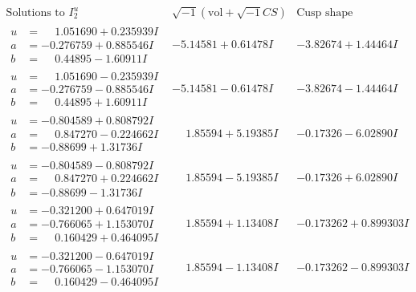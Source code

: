 \documentclass[1p]{elsarticle_modified}
\theoremstyle{definition}
\newcommand{\I}{\sqrt{-1}}
\begin{document}
$$\begin{array}{c|c|c}  
\text{Solutions to }I^u_{2}& \I (\text{vol} + \sqrt{-1}CS) & \text{Cusp shape}\\
 \hline 
\begin{aligned}
u &= \phantom{-}1.051690 + 0.235939 I \\
a &= -0.276759 + 0.885546 I \\
b &= \phantom{-}0.44895 - 1.60911 I\end{aligned}
 & -5.14581 + 0.61478 I & -3.82674 + 1.44464 I \\ \hline\begin{aligned}
u &= \phantom{-}1.051690 - 0.235939 I \\
a &= -0.276759 - 0.885546 I \\
b &= \phantom{-}0.44895 + 1.60911 I\end{aligned}
 & -5.14581 - 0.61478 I & -3.82674 - 1.44464 I \\ \hline\begin{aligned}
u &= -0.804589 + 0.808792 I \\
a &= \phantom{-}0.847270 - 0.224662 I \\
b &= -0.88699 + 1.31736 I\end{aligned}
 & \phantom{-}1.85594 + 5.19385 I & -0.17326 - 6.02890 I \\ \hline\begin{aligned}
u &= -0.804589 - 0.808792 I \\
a &= \phantom{-}0.847270 + 0.224662 I \\
b &= -0.88699 - 1.31736 I\end{aligned}
 & \phantom{-}1.85594 - 5.19385 I & -0.17326 + 6.02890 I \\ \hline\begin{aligned}
u &= -0.321200 + 0.647019 I \\
a &= -0.766065 + 1.153070 I \\
b &= \phantom{-}0.160429 + 0.464095 I\end{aligned}
 & \phantom{-}1.85594 + 1.13408 I & -0.173262 + 0.899303 I \\ \hline\begin{aligned}
u &= -0.321200 - 0.647019 I \\
a &= -0.766065 - 1.153070 I \\
b &= \phantom{-}0.160429 - 0.464095 I\end{aligned}
 & \phantom{-}1.85594 - 1.13408 I & -0.173262 - 0.899303 I \\ \hline\begin{aligned}

\end{aligned}
\end{array}$$
\end{document}
